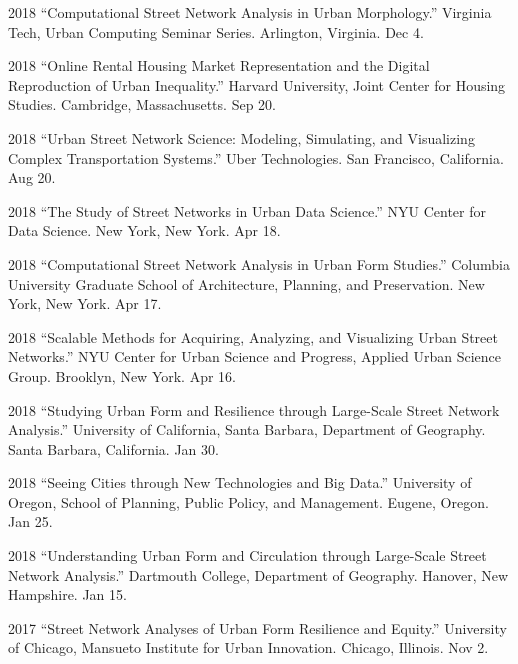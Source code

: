 \documentclass[12pt,letterpaper]{report}
\begin{document}
	\begin{tablist}
		
		\item[2018] \tab \enquote{Computational Street Network Analysis in Urban Morphology.} Virginia Tech, Urban Computing Seminar Series. Arlington, Virginia. Dec 4.	
		
		\item[2018] \tab \enquote{Online Rental Housing Market Representation and the Digital Reproduction of Urban Inequality.} Harvard University, Joint Center for Housing Studies. Cambridge, Massachusetts. Sep 20.
		
		\item[2018] \tab \enquote{Urban Street Network Science: Modeling, Simulating, and Visualizing Complex Transportation Systems.} Uber Technologies. San Francisco, California. Aug 20.
		
		\item[2018] \tab \enquote{The Study of Street Networks in Urban Data Science.} NYU Center for Data Science. New York, New York. Apr 18.
		
		\item[2018] \tab \enquote{Computational Street Network Analysis in Urban Form Studies.} Columbia University Graduate School of Architecture, Planning, and Preservation. New York, New York. Apr 17.
		
		\item[2018] \tab \enquote{Scalable Methods for Acquiring, Analyzing, and Visualizing Urban Street Networks.} NYU Center for Urban Science and Progress, Applied Urban Science Group. Brooklyn, New York. Apr 16.
		
		\item[2018] \tab \enquote{Studying Urban Form and Resilience through Large-Scale Street Network Analysis.} University of California, Santa Barbara, Department of Geography. Santa Barbara, California. Jan 30.
		
		\item[2018] \tab \enquote{Seeing Cities through New Technologies and Big Data.} University of Oregon, School of Planning, Public Policy, and Management. Eugene, Oregon. Jan 25.
		
		\item[2018] \tab \enquote{Understanding Urban Form and Circulation through Large-Scale Street Network Analysis.} Dartmouth College, Department of Geography. Hanover, New Hampshire. Jan 15.
		
		\item[2017] \tab \enquote{Street Network Analyses of Urban Form Resilience and Equity.} University of Chicago, Mansueto Institute for Urban Innovation. Chicago, Illinois. Nov 2.
		

\end{tablist}
\end{document}
